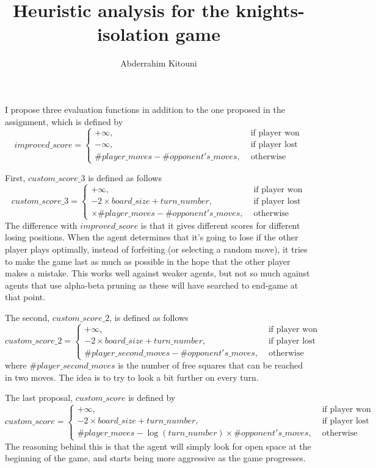 \documentclass[11pt]{article}
\title{Heuristic analysis for the knights-isolation game}
\author{Abderrahim Kitouni}
\begin{document}
\maketitle

I propose three evaluation functions in addition to the one proposed in the assignment, which is defined by
\[
  improved\_score =
  \begin{cases}
    +\infty, & \text{ if player won} \\
    -\infty, & \text{ if player lost} \\
    \#player\_moves - \#opponent's\_moves, & \text{ otherwise}
  \end{cases}
\]

First, $custom\_score\_3$ is defined as follows
\[
  custom\_score\_3 =
  \begin{cases}
    +\infty, & \text{ if player won} \\
    - 2 \times board\_size + turn\_number, & \text{ if player lost} \\
    \times \#player\_moves - \#opponent's\_moves, & \text{ otherwise}
  \end{cases}
\]
The difference with $improved\_score$ is that it gives different scores for different losing positions. When the agent determines that it's going to lose if the other player plays optimally, instead of forfeiting (or selecting a random move), it tries to make the game last as much as possible in the hope that the other player makes a mistake. This works well against weaker agents, but not so much against agents that use alpha-beta pruning as these will have searched to end-game at that point.

The second, $custom\_score\_2$, is defined as follows
\[
  custom\_score\_2 =
  \begin{cases}
    +\infty, & \text{ if player won} \\
    - 2 \times board\_size + turn\_number, & \text{ if player lost} \\
    \#player\_second\_moves - \#opponent's\_moves, & \text{ otherwise}
  \end{cases}
\]
where $\#player\_second\_moves$ is the number of free squares that can be reached in two moves. The idea is to try to look a bit further on every turn.

The last proposal, $custom\_score$ is defined by
\[
  custom\_score =
  \begin{cases}
    +\infty, & \text{ if player won} \\
    - 2 \times board\_size + turn\_number, & \text{ if player lost} \\
    \#player\_moves - \log(turn\_number) \times \#opponent's\_moves, & \text{ otherwise}
  \end{cases}
\]
The reasoning behind this is that the agent will simply look for open space at the beginning of the game, and starts being more aggressive as the game progresses.
\end{document}
